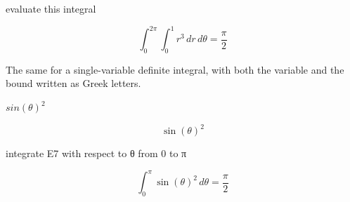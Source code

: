 \documentclass[dvipdfmx]{article}
\begin{document}
evaluate this integral

\begin{equation}
  \int_{0}^{2\pi} \int_{0}^{1} r^3 \, dr \, d\theta = \frac{\pi}{2}
  \label{eq:E6}
\end{equation}

The same for a single-variable definite integral, with both the variable and the bound written as Greek letters.

$sin(\theta )^2$

\begin{equation}
  \sin(\theta)^2
  \label{eq:E7}
\end{equation}

integrate E7 with respect to θ from 0 to π

\begin{equation}
  \int_{0}^{\pi} \sin(\theta)^2 \, d\theta = \frac{\pi}{2}
  \label{eq:E8}
\end{equation}
\end{document}
